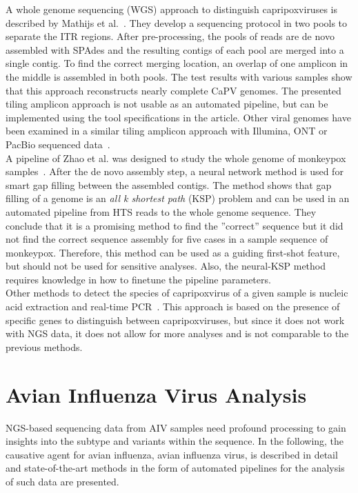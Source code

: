 A whole genome sequencing (WGS) approach to distinguish capripoxviruses is described by Mathijs et al.~\cite{mathijs2022robust}. They develop a sequencing protocol in two pools to separate the ITR regions. After pre-processing, the pools of reads are de novo assembled with SPAdes and the resulting contigs of each pool are merged into a single contig. To find the correct merging location, an overlap of one amplicon in the middle is assembled in both pools. The test results with various samples show that this approach reconstructs nearly complete CaPV genomes.
The presented tiling amplicon approach is not usable as an automated pipeline, but can be implemented using the tool specifications in the article. Other viral genomes have been examined in a similar tiling amplicon approach with Illumina, ONT or PacBio sequenced data~\cite{freed2020rapid, gardner2014multiplex, grubaugh2019amplicon, quick2017multiplex}. \\
A pipeline of Zhao et al. was designed to study the whole genome of monkeypox samples~\cite{zhao2016finishing}. After the de novo assembly step, a neural network method is used for smart gap filling between the assembled contigs. The method shows that gap filling of a genome is an \textit{all k shortest path} (KSP) problem and can be used in an automated pipeline from HTS reads to the whole genome sequence. They conclude that it is a promising method to find the ''correct'' sequence but it did not find the correct sequence assembly for five cases in a sample sequence of monkeypox. Therefore, this method can be used as a guiding first-shot feature, but should not be used for sensitive analyses. Also, the neural-KSP method requires knowledge in how to finetune the pipeline parameters. \\
Other methods to detect the species of capripoxvirus of a given sample is nucleic acid extraction and real-time PCR~\cite{armson2017detection}. This approach is based on the presence of specific genes to distinguish between capripoxviruses, but since it does not work with NGS data, it does not allow for more analyses and is not comparable to the previous methods.

\section{Avian Influenza Virus Analysis}\label{sec:AIV}
NGS-based sequencing data from AIV samples need profound processing to gain insights into the subtype and variants within the sequence. In the following, the causative agent for avian influenza, avian influenza virus, is described in detail and state-of-the-art methods in the form of automated pipelines for the analysis of such data are presented.

